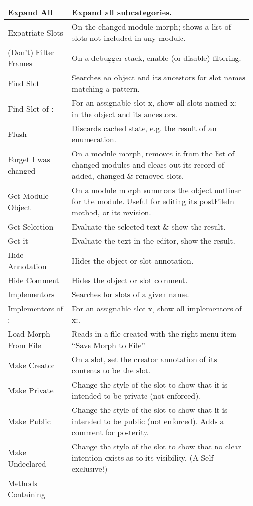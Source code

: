 \documentclass[letterpaper,10pt,english]{sphinxmanual}
\begin{document}
\begin{longtable}{p{5cm} p{10cm}}
\hline
Expand All
&
Expand all subcategories.
\\
\hline
Expatriate Slots
&
On the changed module morph; shows a list of slots not included in any module.
\\
\hline
(Don’t) Filter Frames
&
On a debugger stack, enable (or disable) filtering.
\\
\hline
Find Slot
&
Searches an object and its ancestors for slot names matching a pattern.
\\
\hline
Find Slot of :
&
For an assignable slot x, show all slots named x: in the object and its ancestors.
\\
\hline
Flush
&
Discards cached state, e.g. the result of an enumeration.
\\
\hline
Forget I was changed
&
On a module morph, removes it from the list of changed modules and clears out its record of added, changed \& removed slots.
\\
\hline
Get Module Object
&
On a module morph summons the object outliner for the module. Useful for editing its postFileIn method, or its revision.
\\
\hline
Get Selection
&
Evaluate the selected text \& show the result.
\\
\hline
Get it
&
Evaluate the text in the editor, show the result.
\\
\hline
Hide Annotation
&
Hides the object or slot annotation.
\\
\hline
Hide Comment
&
Hides the object or slot comment.
\\
\hline
Implementors
&
Searches for slots of a given name.
\\
\hline
Implementors of :
&
For an assignable slot x, show all implementors of x:.
\\
\hline
Load Morph From File
&
Reads in a file created with the right-menu item “Save Morph to File”
\\
\hline
Make Creator
&
On a slot, set the creator annotation of its contents to be the slot.
\\
\hline
Make Private
&
Change the style of the slot to show that it is intended to be private (not enforced).
\\
\hline
Make Public
&
Change the style of the slot to show that it is intended to be public (not enforced). Adds a comment for posterity.
\\
\hline
Make Undeclared
&
Change the style of the slot to show that no clear intention exists as to its visibility. (A Self exclusive!)
\\
\hline
Methods Containing

\end{longtable}
\end{document}

